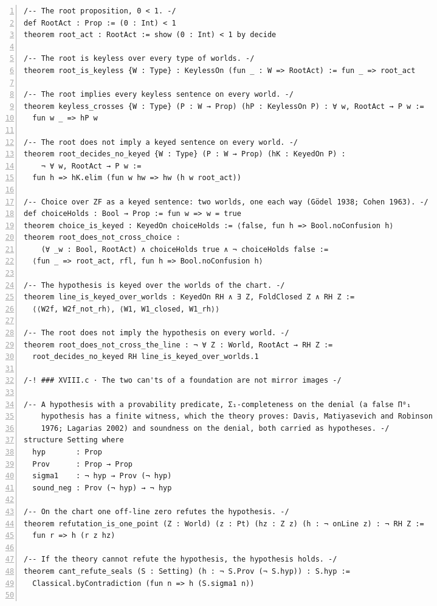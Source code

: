 \documentclass[10pt]{article}
\newcommand{\leansize}{\fontsize{5.5pt}{6.75pt}\selectfont}
\begin{document}
\begin{multicols}{2}
\begin{Verbatim}[numbers=left,firstnumber=1,numbersep=3pt,xleftmargin=2.6em,breaklines=true,breakanywhere=true,breakautoindent=false,breakindent=1.4em,breaksymbolleft={},breakanywheresymbolpre={},fontsize=\leansize]
/-- The root proposition, 0 < 1. -/
def RootAct : Prop := (0 : Int) < 1
theorem root_act : RootAct := show (0 : Int) < 1 by decide

/-- The root is keyless over every type of worlds. -/
theorem root_is_keyless {W : Type} : KeylessOn (fun _ : W => RootAct) := fun _ => root_act

/-- The root implies every keyless sentence on every world. -/
theorem keyless_crosses {W : Type} (P : W → Prop) (hP : KeylessOn P) : ∀ w, RootAct → P w :=
  fun w _ => hP w

/-- The root does not imply a keyed sentence on every world. -/
theorem root_decides_no_keyed {W : Type} (P : W → Prop) (hK : KeyedOn P) :
    ¬ ∀ w, RootAct → P w :=
  fun h => hK.elim (fun w hw => hw (h w root_act))

/-- Choice over ZF as a keyed sentence: two worlds, one each way (Gödel 1938; Cohen 1963). -/
def choiceHolds : Bool → Prop := fun w => w = true
theorem choice_is_keyed : KeyedOn choiceHolds := ⟨false, fun h => Bool.noConfusion h⟩
theorem root_does_not_cross_choice :
    (∀ _w : Bool, RootAct) ∧ choiceHolds true ∧ ¬ choiceHolds false :=
  ⟨fun _ => root_act, rfl, fun h => Bool.noConfusion h⟩

/-- The hypothesis is keyed over the worlds of the chart. -/
theorem line_is_keyed_over_worlds : KeyedOn RH ∧ ∃ Z, FoldClosed Z ∧ RH Z :=
  ⟨⟨W2f, W2f_not_rh⟩, ⟨W1, W1_closed, W1_rh⟩⟩

/-- The root does not imply the hypothesis on every world. -/
theorem root_does_not_cross_the_line : ¬ ∀ Z : World, RootAct → RH Z :=
  root_decides_no_keyed RH line_is_keyed_over_worlds.1

/-! ### XVIII.c · The two can'ts of a foundation are not mirror images -/

/-- A hypothesis with a provability predicate, Σ₁-completeness on the denial (a false Π⁰₁
    hypothesis has a finite witness, which the theory proves: Davis, Matiyasevich and Robinson
    1976; Lagarias 2002) and soundness on the denial, both carried as hypotheses. -/
structure Setting where
  hyp       : Prop
  Prov      : Prop → Prop
  sigma1    : ¬ hyp → Prov (¬ hyp)
  sound_neg : Prov (¬ hyp) → ¬ hyp

/-- On the chart one off-line zero refutes the hypothesis. -/
theorem refutation_is_one_point (Z : World) (z : Pt) (hz : Z z) (h : ¬ onLine z) : ¬ RH Z :=
  fun r => h (r z hz)

/-- If the theory cannot refute the hypothesis, the hypothesis holds. -/
theorem cant_refute_seals (S : Setting) (h : ¬ S.Prov (¬ S.hyp)) : S.hyp :=
  Classical.byContradiction (fun n => h (S.sigma1 n))


\end{Verbatim}
\end{multicols}
\end{document}
